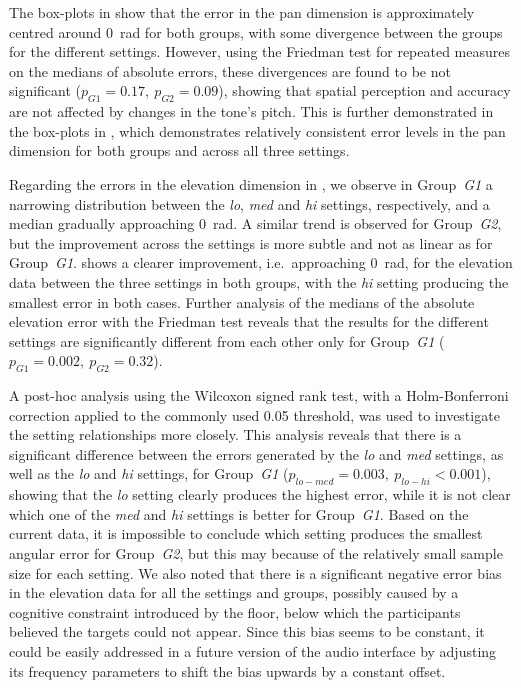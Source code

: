 \documentclass[acmsmall]{acmart}
\begin{document}
The box-plots in  show that the error in the pan dimension is approximately centred around \SI{0}{\radian} for both groups, with some divergence between the groups for the different settings.
However, using the Friedman test for repeated measures on the medians of absolute errors, these divergences are found to be not significant ($p_{G1} = 0.17,~p_{G2} = 0.09$), showing that spatial perception and accuracy are not affected by changes in the tone's pitch.
This is further demonstrated in the box-plots in , which demonstrates relatively consistent error levels in the pan dimension for both groups and across all three settings. 

Regarding the errors in the elevation dimension in , we observe in Group~\textit{G1} a narrowing distribution between the \textit{lo}, \textit{med} and \textit{hi} settings, respectively, and a median gradually approaching \SI{0}{\radian}.
A similar trend is observed for Group~\textit{G2}, but the improvement across the settings is more subtle and not as linear as for Group~\textit{G1}.
 shows a clearer improvement, i.e.\ approaching \SI{0}{\radian}, for the elevation data between the three settings in both groups, with the \textit{hi} setting producing the smallest error in both cases.
Further analysis of the medians of the absolute elevation error with the Friedman test reveals that the results for the different settings are significantly different from each other only for Group~\textit{G1} ($p_{G1} = 0.002,~p_{G2} = 0.32$).

A post-hoc analysis using the Wilcoxon signed rank test, with a Holm-Bonferroni correction applied to the commonly used 0.05 threshold, was used to investigate the setting relationships more closely. 
This analysis reveals that there is a significant difference between the errors generated by the \textit{lo} and \textit{med} settings, as well as the \textit{lo} and \textit{hi} settings, for Group~\textit{G1} ($p_{lo-med} = 0.003,~p_{lo-hi} < 0.001$), showing that the \textit{lo} setting clearly produces the highest error, while it is not clear which one of the \textit{med} and \textit{hi} settings is better for Group~\textit{G1}. 
Based on the current data, it is impossible to conclude which setting produces the smallest angular error for Group~\textit{G2}, but this may because of the relatively small sample size for each setting. 
We also noted that there is a significant negative error bias in the elevation data for all the settings and groups, possibly caused by a cognitive constraint introduced by the floor, below which the participants believed the targets could not appear.
Since this bias seems to be constant, it could be easily addressed in a future version of the audio interface by adjusting its frequency parameters to shift the bias upwards by a constant offset. 
\end{document}
